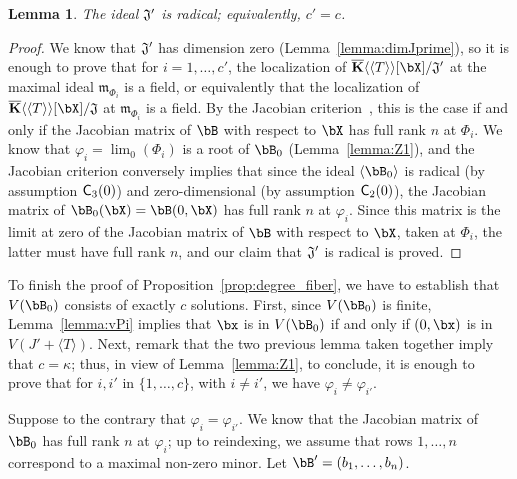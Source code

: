 \documentclass[12pt]{article}
\newtheorem{lemma}[definition]{Lemma}
\begin{document}
\begin{lemma}\label{lemma:Jprimerad}
  The ideal $\frak{J}'$ is radical; equivalently, $c'=c$.
\end{lemma}
\begin{proof}
  We know that $\frak{J}'$ has dimension zero
  (Lemma~\ref{lemma:dimJprime}), so it is enough to prove that for
  $i=1,\dots,c'$, the localization of
  $\KKbar\langle\langle T \rangle\rangle[\bX]/\frak{J}'$ at the
  maximal ideal $\mathfrak{m}_{\Phi_i}$ is a field, or equivalently
  that the localization of
  $\KKbar\langle\langle T \rangle\rangle[\bX]/\frak{J}$ at
  $\mathfrak{m}_{\Phi_i}$ is a field.  By the Jacobian
  criterion~\cite[Theorem~16.19.b]{Eisenbud95}, this is the case if
  and only if the Jacobian matrix of $\bB$ with respect to $\bX$ has
  full rank $n$ at $\Phi_i$. We know that $\varphi_i=\lim_0(\Phi_i)$
  is a root of $\bB_0$ (Lemma~\ref{lemma:Z1}), and the Jacobian criterion conversely implies
  that since the ideal $\langle \bB_0 \rangle$ is radical (by
  assumption $\mathsf{C}_3(0)$) and zero-dimensional (by assumption
  $\mathsf{C}_2(0)$), the Jacobian matrix of $\bB_0(\bX)=\bB(0,\bX)$ has
  full rank $n$ at $\varphi_i$. Since this matrix is the limit at zero of the
  Jacobian matrix of $\bB$ with respect to $\bX$, taken at $\Phi_i$,
  the latter must have full rank $n$, and our claim that $\frak{J}'$
  is radical is proved.
\end{proof}

To finish the proof of Proposition~\ref{prop:degree_fiber}, we have to
establish that $V(\bB_0)$ consists of exactly $c$ solutions. First,
since $V(\bB_0)$ is finite, Lemma~\ref{lemma:vPi} implies that $\bx$
is in $V(\bB_0)$ if and only if $(0,\bx)$ is in $V(J' + \langle
T\rangle)$. Next, remark that the two previous lemma taken together
imply that $c=\kappa$; thus, in view of Lemma~\ref{lemma:Z1}, to
conclude, it is enough to prove that for $i,i'$ in $\{1,\dots,c\}$,
with $i \ne i'$, we have $\varphi_i \ne \varphi_{i'}$.

Suppose to the contrary that $\varphi_i = \varphi_{i'}$. We know that
the Jacobian matrix of $\bB_0$ has full rank $n$ at $\varphi_i$; up to
reindexing, we assume that rows $1,\dots,n$ correspond to a maximal
non-zero minor. Let $\bB'=(b_1,\dots,b_n)$.
\end{document}
